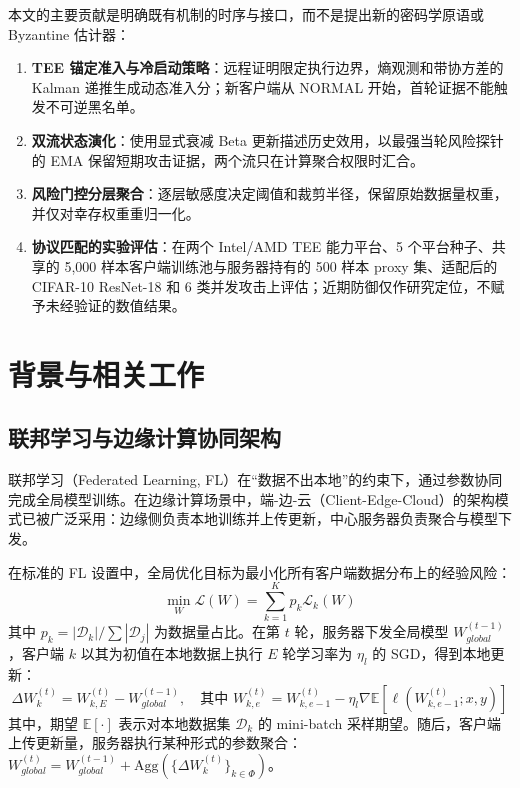 \documentclass[11pt, a4paper, UTF8, fontset=fandol]{ctexart}
\begin{document}
本文的主要贡献是明确既有机制的时序与接口，而不是提出新的密码学原语或 Byzantine 估计器：
\begin{enumerate}
    \item \textbf{TEE 锚定准入与冷启动策略}：远程证明限定执行边界，熵观测和带协方差的 Kalman 递推生成动态准入分；新客户端从 NORMAL 开始，首轮证据不能触发不可逆黑名单。
    \item \textbf{双流状态演化}：使用显式衰减 Beta 更新描述历史效用，以最强当轮风险探针的 EMA 保留短期攻击证据，两个流只在计算聚合权限时汇合。
    \item \textbf{风险门控分层聚合}：逐层敏感度决定阈值和裁剪半径，保留原始数据量权重，并仅对幸存权重重归一化。
    \item \textbf{协议匹配的实验评估}：在两个 Intel/AMD TEE 能力平台、5 个平台种子、共享的 5,000 样本客户端训练池与服务器持有的 500 样本 proxy 集、适配后的 CIFAR-10 ResNet-18 和 6 类并发攻击上评估；近期防御仅作研究定位，不赋予未经验证的数值结果。
\end{enumerate}


\section{背景与相关工作}

\subsection{联邦学习与边缘计算协同架构}
联邦学习（Federated Learning, FL）在“数据不出本地”的约束下，通过参数协同完成全局模型训练。在边缘计算场景中，端-边-云（Client-Edge-Cloud）的架构模式已被广泛采用：边缘侧负责本地训练并上传更新，中心服务器负责聚合与模型下发。

在标准的 FL 设置中，全局优化目标为最小化所有客户端数据分布上的经验风险：
\begin{equation}
    \min_{W} \mathcal{L}(W) = \sum_{k=1}^K p_k \mathcal{L}_k(W)
\end{equation}
其中 $p_k = |\mathcal{D}_k| / \sum |\mathcal{D}_j|$ 为数据量占比。在第 $t$ 轮，服务器下发全局模型 $W_{global}^{(t-1)}$，客户端 $k$ 以其为初值在本地数据上执行 $E$ 轮学习率为 $\eta_l$ 的 SGD，得到本地更新：
\begin{equation}
    \Delta W_{k}^{(t)} = W_{k, E}^{(t)} - W_{global}^{(t-1)}, \quad \text{其中 } W_{k, e}^{(t)} = W_{k, e-1}^{(t)} - \eta_l \nabla \mathbb{E}[\ell(W_{k, e-1}^{(t)}; x, y)]
\end{equation}
其中，期望 $\mathbb{E}[\cdot]$ 表示对本地数据集 $\mathcal{D}_k$ 的 mini-batch 采样期望。随后，客户端上传更新量，服务器执行某种形式的参数聚合：$W_{global}^{(t)} = W_{global}^{(t-1)} + \mathrm{Agg}(\{ \Delta W_{k}^{(t)} \}_{k\in\Phi})$。
\end{document}
